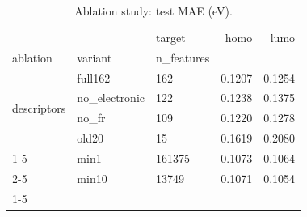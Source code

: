 \begin{table}
\caption{Ablation study: test MAE (eV).}
\label{tab:ablations}
\begin{tabular}{lllrr}
\toprule
 &  & target & homo & lumo \\
ablation & variant & n\_features &  &  \\
\midrule
\multirow[t]{4}{*}{descriptors} & full162 & 162 & 0.1207 & 0.1254 \\
\cline{2-5}
 & no\_electronic & 122 & 0.1238 & 0.1375 \\
\cline{2-5}
 & no\_fr & 109 & 0.1220 & 0.1278 \\
\cline{2-5}
 & old20 & 15 & 0.1619 & 0.2080 \\
\cline{1-5} \cline{2-5}
\multirow[t]{2}{*}{fingerprint} & min1 & 161375 & 0.1073 & 0.1064 \\
\cline{2-5}
 & min10 & 13749 & 0.1071 & 0.1054 \\
\cline{1-5} \cline{2-5}
\bottomrule
\end{tabular}
\end{table}

